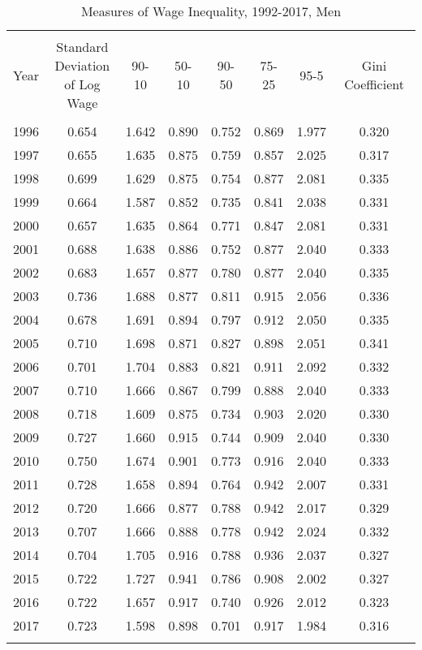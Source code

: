 
\begin{table}[!htbp] \centering 
  \caption{Measures of Wage Inequality, 1992-2017, Men} 
  \label{tab:tab_wage_ineq_measures_men} 
\begin{tabular}{@{\extracolsep{5pt}} cccccccc} 
\\[-1.8ex]\hline 
\hline \\[-1.8ex] 
Year & \thead{Standard \\ Deviation \\ of Log Wage} & 90-10 & 50-10 & 90-50 & 75-25 & 95-5 & Gini Coefficient \\ 
\hline \\[-1.8ex] 
1996 & 0.654 & 1.642 & 0.890 & 0.752 & 0.869 & 1.977 & 0.320 \\ 
1997 & 0.655 & 1.635 & 0.875 & 0.759 & 0.857 & 2.025 & 0.317 \\ 
1998 & 0.699 & 1.629 & 0.875 & 0.754 & 0.877 & 2.081 & 0.335 \\ 
1999 & 0.664 & 1.587 & 0.852 & 0.735 & 0.841 & 2.038 & 0.331 \\ 
2000 & 0.657 & 1.635 & 0.864 & 0.771 & 0.847 & 2.081 & 0.331 \\ 
2001 & 0.688 & 1.638 & 0.886 & 0.752 & 0.877 & 2.040 & 0.333 \\ 
2002 & 0.683 & 1.657 & 0.877 & 0.780 & 0.877 & 2.040 & 0.335 \\ 
2003 & 0.736 & 1.688 & 0.877 & 0.811 & 0.915 & 2.056 & 0.336 \\ 
2004 & 0.678 & 1.691 & 0.894 & 0.797 & 0.912 & 2.050 & 0.335 \\ 
2005 & 0.710 & 1.698 & 0.871 & 0.827 & 0.898 & 2.051 & 0.341 \\ 
2006 & 0.701 & 1.704 & 0.883 & 0.821 & 0.911 & 2.092 & 0.332 \\ 
2007 & 0.710 & 1.666 & 0.867 & 0.799 & 0.888 & 2.040 & 0.333 \\ 
2008 & 0.718 & 1.609 & 0.875 & 0.734 & 0.903 & 2.020 & 0.330 \\ 
2009 & 0.727 & 1.660 & 0.915 & 0.744 & 0.909 & 2.040 & 0.330 \\ 
2010 & 0.750 & 1.674 & 0.901 & 0.773 & 0.916 & 2.040 & 0.333 \\ 
2011 & 0.728 & 1.658 & 0.894 & 0.764 & 0.942 & 2.007 & 0.331 \\ 
2012 & 0.720 & 1.666 & 0.877 & 0.788 & 0.942 & 2.017 & 0.329 \\ 
2013 & 0.707 & 1.666 & 0.888 & 0.778 & 0.942 & 2.024 & 0.332 \\ 
2014 & 0.704 & 1.705 & 0.916 & 0.788 & 0.936 & 2.037 & 0.327 \\ 
2015 & 0.722 & 1.727 & 0.941 & 0.786 & 0.908 & 2.002 & 0.327 \\ 
2016 & 0.722 & 1.657 & 0.917 & 0.740 & 0.926 & 2.012 & 0.323 \\ 
2017 & 0.723 & 1.598 & 0.898 & 0.701 & 0.917 & 1.984 & 0.316 \\ 
\hline \\[-1.8ex] 
\end{tabular} 
\end{table} 
